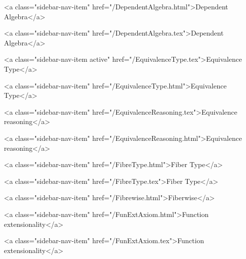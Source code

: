       
    
      
        
          <a class="sidebar-nav-item" href="/DependentAlgebra.html">Dependent Algebra</a>
        
      
    
      
        
          <a class="sidebar-nav-item" href="/DependentAlgebra.tex">Dependent Algebra</a>
        
      
    
      
        
          <a class="sidebar-nav-item active" href="/EquivalenceType.tex">Equivalence Type</a>
        
      
    
      
        
          <a class="sidebar-nav-item" href="/EquivalenceType.html">Equivalence Type</a>
        
      
    
      
        
          <a class="sidebar-nav-item" href="/EquivalenceReasoning.tex">Equivalence reasoning</a>
        
      
    
      
        
          <a class="sidebar-nav-item" href="/EquivalenceReasoning.html">Equivalence reasoning</a>
        
      
    
      
        
          <a class="sidebar-nav-item" href="/FibreType.html">Fiber Type</a>
        
      
    
      
        
          <a class="sidebar-nav-item" href="/FibreType.tex">Fiber Type</a>
        
      
    
      
        
          <a class="sidebar-nav-item" href="/Fibrewise.html">Fiberwise</a>
        
      
    
      
        
          <a class="sidebar-nav-item" href="/FunExtAxiom.html">Function extensionality</a>
        
      
    
      
        
          <a class="sidebar-nav-item" href="/FunExtAxiom.tex">Function extensionality</a>
        

